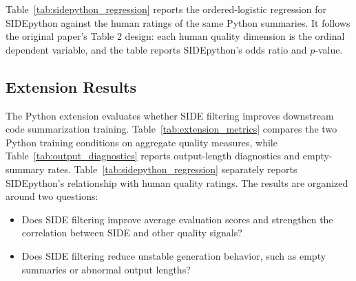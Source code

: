 Table~\ref{tab:sidepython_regression} reports the ordered-logistic regression for SIDEpython against the human ratings of the same Python summaries. It follows the original paper's Table 2 design: each human quality dimension is the ordinal dependent variable, and the table reports SIDEpython's odds ratio and $p$-value.


\subsection{Extension Results}

The Python extension evaluates whether SIDE filtering improves downstream code summarization training. Table~\ref{tab:extension_metrics} compares the two Python training conditions on aggregate quality measures, while Table~\ref{tab:output_diagnostics} reports output-length diagnostics and empty-summary rates. Table~\ref{tab:sidepython_regression} separately reports SIDEpython's relationship with human quality ratings. The results are organized around two questions:

\begin{table}[t]
\centering
\caption{SIDEpython ordered-logistic regression against human ratings. Each cell reports an odds ratio and its unadjusted Wald $p$-value; predictors are min--max scaled to the 0--5 response range, matching the Java SIDE analysis. Overall is the mean of the three available human ratings, not a separately collected Overall DA Score.}
\label{tab:sidepython_regression}
\scriptsize
\setlength{\tabcolsep}{3pt}
\resizebox{\textwidth}{!}{%
%
}
\end{table}

\begin{table}[t]
\centering
\caption{Unscaled PCA of the nine Python evaluation metrics.}
\label{tab:sidepython_pca}
\scriptsize
\setlength{\tabcolsep}{3pt}
\resizebox{\textwidth}{!}{%
%
}
\end{table}

\begin{itemize}

    \item Does SIDE filtering improve average evaluation scores and strengthen the correlation between SIDE and other quality signals?

    \item Does SIDE filtering reduce unstable generation behavior, such as empty summaries or abnormal output lengths?
\end{itemize}

